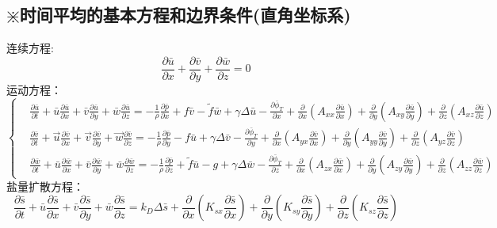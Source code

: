 \documentclass[a4paper,12pt]{article}
\begin{document}
    \subsection{ \texorpdfstring{\color{red} $\divideontimes$} 时时间平均的基本方程和边界条件(直角坐标系)}
    \begin{framed}
    连续方程:
    \[
        \frac{\partial \bar{u}}{\partial x}+\frac{\partial \bar{v}}{\partial y}+\frac{\partial \bar{w}}{\partial z}=0
    \]
    运动方程：
    \[
        \left\{
        \begin{aligned}
            &\frac{\partial \bar{u}}{\partial t}+\bar{u} \frac{\partial \bar{u}}{\partial x}+\bar{v} \frac{\partial \bar{u}}{\partial y}+\bar{w} \frac{\partial \bar{u}}{\partial z}=-\frac{1}{\rho} \frac{\partial \bar{p}}{\partial x}+f \bar{v}-\tilde{f} \bar{w}+\gamma \Delta \bar{u}-\frac{\partial \bar{\phi}_{T}}{\partial x}+\frac{\partial}{\partial x}\left(A_{x x} \frac{\partial \bar{u}}{\partial x}\right)+\frac{\partial}{\partial y}\left(A_{x y} \frac{\partial \bar{u}}{\partial y}\right)+\frac{\partial}{\partial z}\left(A_{x z} \frac{\partial \bar{u}}{\partial z}\right)\\
            &\frac{\partial \bar{v}}{\partial t}+\vec{u} \frac{\partial \bar{v}}{\partial x}+\vec{v} \frac{\partial \bar{v}}{\partial y}+\vec{w} \frac{\partial \bar{v}}{\partial z}=-\frac{1}{\rho} \frac{\partial \bar{p}}{\partial y}-f \bar{u}+\gamma \Delta \bar{v}-\frac{\partial \bar{\phi}_{T}}{\partial y}+\frac{\partial}{\partial x}\left(A_{y x} \frac{\partial \bar{v}}{\partial x}\right)+\frac{\partial}{\partial y}\left(A_{y y} \frac{\partial \bar{v}}{\partial y}\right)+\frac{\partial}{\partial z}\left(A_{y z} \frac{\partial \bar{v}}{\partial z}\right)\\
            &\frac{\partial \bar{w}}{\partial t}+\bar{u} \frac{\partial \bar{w}}{\partial x}+\bar{v} \frac{\partial \bar{w}}{\partial y}+\bar{w} \frac{\partial \bar{w}}{\partial z}=-\frac{1}{\rho} \frac{\partial \bar{p}}{\partial z}+\tilde{f} \bar{u}-g+\gamma \Delta \bar{w}-\frac{\partial \bar{\phi}_{T}}{\partial z}+\frac{\partial}{\partial x}\left(A_{z x} \frac{\partial \bar{w}}{\partial x}\right)+\frac{\partial}{\partial y}\left(A_{z y} \frac{\partial \bar{w}}{\partial y}\right)+\frac{\partial}{\partial z}\left(A_{z z} \frac{\partial \bar{w}}{\partial z}\right)
        \end{aligned}
        \right.
    \]
    盐量扩散方程：
    \[
        \frac{\partial \bar{s}}{\partial t}+\bar{u} \frac{\partial \bar{s}}{\partial x}+\bar{v} \frac{\partial \bar{s}}{\partial y}+\bar{w} \frac{\partial \bar{s}}{\partial z}=k_{D} \Delta \bar{s}+\frac{\partial}{\partial x}\left(K_{s x} \frac{\partial \bar{s}}{\partial x}\right)+\frac{\partial}{\partial y}\left(K_{s y} \frac{\partial \bar{s}}{\partial y}\right)+\frac{\partial}{\partial z}\left(K_{s z} \frac{\partial \bar{s}}{\partial z}\right)
\]
\end{framed}
\end{document}
